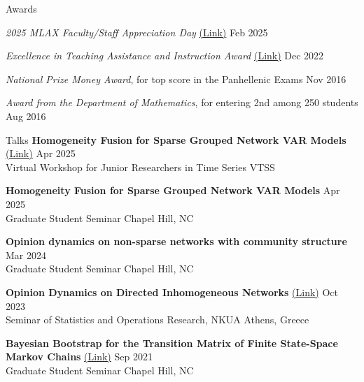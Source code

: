 \documentclass{resume} %
\begin{document}
\begin{rSection}{Awards} 
\vspace{-1.25em}
    \item \textit{2025 MLAX Faculty/Staff Appreciation Day } \href{https://goheels.com/news/2025/2/5/mens-lacrosse-announces-2025-promotional-schedule}{(Link)} \hfill Feb 2025
    \item \textit{Excellence in Teaching Assistance and Instruction Award} \href{https://stor.unc.edu/news-item/student-awards/}{(Link)} \hfill Dec 2022 
    \item \textit{National Prize Money Award}, for top score in the Panhellenic Exams \hfill Nov 2016
    \item \textit{Award from the Department of Mathematics}, for entering 2nd among 250 students \hfill Aug 2016


\end{rSection}


\begin{rSection}{Talks}
    {\bf Homogeneity Fusion for Sparse Grouped Network VAR Models} \href{https://sites.google.com/view/vtss/workshop}{(Link)} \hfill Apr 2025 \\ 
    Virtual Workshop for Junior Researchers in Time Series \hfill VTSS

    {\bf Homogeneity Fusion for Sparse Grouped Network VAR Models} \hfill Apr 2025 \\ 
    Graduate Student Seminar \hfill Chapel Hill, NC
    
    {\bf Opinion dynamics on non-sparse networks with community structure} \hfill Mar 2024 \\ 
    Graduate Student Seminar \hfill Chapel Hill, NC

    {\bf Opinion Dynamics on Directed Inhomogeneous Networks} \href{http://users.uoa.gr/~strevezas/Seminar-Stat-OR/}{(Link)} \hfill Oct 2023 \\ 
    Seminar of Statistics and Operations Research, NKUA \hfill Athens, Greece

    {\bf Bayesian Bootstrap for the Transition Matrix of Finite State-Space Markov Chains} \href{https://stor.unc.edu/event/graduate-seminar-panagiotis-andreou/}{(Link)} \hfill Sep 2021 \\
    Graduate Student Seminar \hfill Chapel Hill, NC
\end{rSection}
\end{document}
